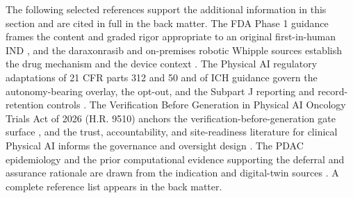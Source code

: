 The following selected references support the additional information in this section
and are cited in full in the back matter. The FDA Phase 1 guidance frames the
content and graded rigor appropriate to an original first-in-human IND
\cite{phase1guidance}, and the daraxonrasib and on-premises robotic Whipple sources
establish the drug mechanism and the device context \cite{daraxwhipple,onpremwhippl}.
The Physical AI regulatory adaptations of 21 CFR parts 312 and 50 and of ICH
guidance govern the autonomy-bearing overlay, the opt-out, and the Subpart J
reporting and record-retention controls \cite{cfr312paiuni,cfr050paiuni,ichpaistduni}.
The Verification Before Generation in Physical AI Oncology Trials Act of 2026 (H.R.
9510) anchors the verification-before-generation gate surface
\cite{congress9510}, and the trust, accountability, and site-readiness literature for
clinical Physical AI informs the governance and oversight design
\cite{clintrustpai,paiautospons,natlpaiplatf,paisitedocpk}. The PDAC epidemiology and
the prior computational evidence supporting the deferral and assurance rationale are
drawn from the indication and digital-twin sources
\cite{pdac060s2030,qspmetpancre,fdadigtwinpc,chatgpt100kp,pdacdigtwinp,llmcomp16fda,paipredict4x}.
A complete reference list appears in the back matter.
